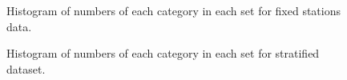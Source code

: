 \documentclass[12pt]{article}\usepackage[]{graphicx}\usepackage[]{color}
\begin{document}
\begin{appendices}
\begin{figure}[htb]
{}

\caption{Histogram of numbers of each category in each set for fixed stations data.}\label{fig:num-fix}
\end{figure}
\begin{figure}[htb]

{\centering {} 

}

\caption{Histogram of numbers of each category in each set for stratified dataset.}\label{fig:num-strat}
\end{figure}
\begin{figure}[htb]


\end{figure}
\end{appendices}
\end{document}
